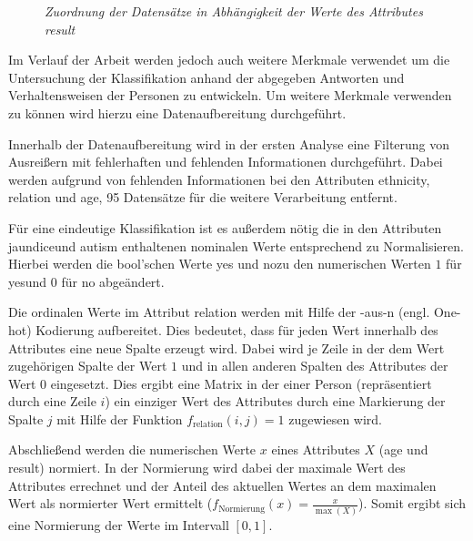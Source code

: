 \begin{figure}[h!]
\centering

\caption{\em Zuordnung der Datensätze in Abhängigkeit der Werte des Attributes \textit{result}}
\label{fig:result_classification}
\end{figure}

Im Verlauf der Arbeit werden jedoch auch weitere Merkmale verwendet um die Untersuchung der Klassifikation anhand der abgegeben Antworten und Verhaltensweisen der Personen zu entwickeln. Um weitere Merkmale verwenden zu können wird hierzu eine Datenaufbereitung durchgeführt.

Innerhalb der Datenaufbereitung wird in der ersten Analyse eine Filterung von Ausreißern mit fehlerhaften und fehlenden Informationen durchgeführt. Dabei werden aufgrund von fehlenden Informationen bei den Attributen \glqq ethnicity\grqq, \glqq relation\grqq{} und \glqq age\grqq{}, 95 Datensätze für die weitere Verarbeitung entfernt.

Für eine eindeutige Klassifikation ist es außerdem nötig die in den Attributen \glqq jaundice\grqq und \glqq autism\grqq {} enthaltenen nominalen Werte entsprechend zu Normalisieren. Hierbei werden die bool'schen Werte \glqq yes\grqq{} und \glqq no\grqq zu den numerischen Werten $1$ für \glqq yes\grqq und $0$ für \glqq no\grqq{} abgeändert. 

Die ordinalen Werte im Attribut \glqq relation\grqq{} werden mit Hilfe der -aus-n\grqq{} (engl. \glqq One-hot\grqq) Kodierung aufbereitet. Dies bedeutet, dass für jeden Wert innerhalb des Attributes eine neue Spalte erzeugt wird. Dabei wird je Zeile in der dem Wert zugehörigen Spalte der Wert $1$ und in allen anderen Spalten des Attributes der Wert $0$ eingesetzt. Dies ergibt eine Matrix in der einer Person (repräsentiert durch eine Zeile $i$) ein einziger Wert des Attributes durch eine Markierung der Spalte $j$ mit Hilfe der Funktion $f_{\text{relation}}(i,j)=1$ zugewiesen wird.

Abschließend werden die numerischen Werte $x$ eines Attributes $X$ (\glqq age\grqq{} und \glqq result\grqq{}) normiert. In der Normierung wird dabei der maximale Wert des Attributes errechnet und der Anteil des aktuellen Wertes an dem maximalen Wert als normierter Wert ermittelt ($f_{\text{Normierung}}(x) = \frac{x}{\max(X)}$). Somit ergibt sich eine Normierung der Werte im Intervall $[0,1]$.

